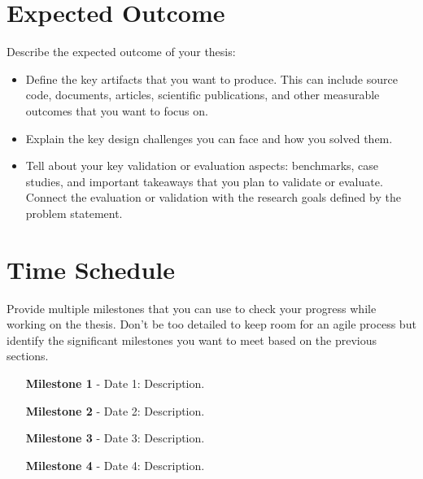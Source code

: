 \section*{Expected Outcome}

\begin{tcolorbox}[breakable]
	Describe the expected outcome of your thesis:
	\begin{itemize}
		\item Define the key artifacts that you want to produce. This can include source code, documents, articles, scientific publications, and other measurable outcomes that you want to focus on.
		\item Explain the key design challenges you can face and how you solved them.
		\item Tell about your key validation or evaluation aspects: benchmarks, case studies, and important takeaways that you plan to validate or evaluate. Connect the evaluation or validation with the research goals defined by the problem statement.
	\end{itemize}
\end{tcolorbox}

\section*{Time Schedule}

\begin{tcolorbox}[breakable]
	Provide multiple milestones that you can use to check your progress while working on the thesis.
	Don't be too detailed to keep room for an agile process but identify the significant milestones you want to meet based on the previous sections.
\end{tcolorbox}

\begin{itemize}[itemindent=-13pt, leftmargin=43pt, align=left]
    \item[\textbf{Milestone 1} - Date 1:] Description.
    \item[\textbf{Milestone 2} - Date 2:] Description.
    \item[\textbf{Milestone 3} - Date 3:] Description.
    \item[\textbf{Milestone 4} - Date 4:] Description.
\end{itemize}


\backmatter









